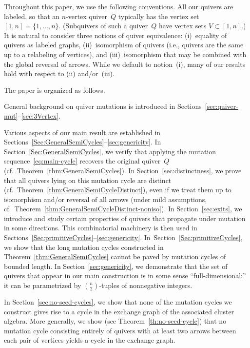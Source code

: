 \documentclass[11pt, letterpaper]{amsart}
\theoremstyle{definition}
\numberwithin{equation}{section}
\begin{document}
\medskip

Throughout this paper, we use the following conventions. 
All our quivers are labeled, so that an $n$-vertex quiver~$Q$ typically has the vertex set $[1,n]=\{1,\ldots, n\}$. 
(Subquivers of such a quiver~$Q$ have vertex sets $V\subset [1,n]$.) 
It is natural to consider three notions of quiver equivalence: 
(i)~equality of quivers as labeled graphs, 
\hbox{(ii)~isomorphism} of quivers  (i.e., quivers are the same up to a relabeling of vertices), and 
(iii)~isomorphism that may be combined with the global reversal of arrows. 
While we default to notion~(i), many of our results hold with respect to (ii) and/or~(iii). 


\medskip

The paper is organized as follows. 

General background on quiver mutations is intro\-duced in Sections~\ref{sec:quiver-mut}--\ref{sec:3Vertex}. 

Various aspects of our main result are established in 
Sections~\ref{Sec:GeneralSemiCycles}--\ref{sec:genericity}.
In Section~\ref{Sec:GeneralSemiCycles}, we verify that applying the mutation sequence~\eqref{eq:main-cycle}
recovers the original quiver~$Q$ (cf.\ Theorem~\ref{thm:GeneralSemiCycles}). 
In Section~\ref{sec:distinctness}, we prove that all  quivers lying on this mutation cycle are distinct
(cf.\ Theorem~\ref{thm:GeneralSemiCycleDistinct}),
even if we treat them up to isomorphism and/or reversal of all arrows 
(under mild assumptions, cf.\ Theorem~\ref{thm:GeneralSemiCycleDistinct-noniso}). 
In Section~\ref{sec:exits}, we introduce and study certain properties of quivers that propagate under mutation in some directions. 
This combinatorial machinery is then used in Sections~\ref{Sec:primitiveCycles}--\ref{sec:genericity}.  
In~Section~\ref{Sec:primitiveCycles}, we show that the long mutation cycles constructed in Theorem~\ref{thm:GeneralSemiCycles}
cannot be paved by mutation cycles of bounded length. 
In Section~\ref{sec:genericity}, we demonstrate that the set of quivers that appear in our main construction 
is in some sense ``full-dimensional:''
it can be parametrized by $\binom{n}{2}$-tuples of nonnegative integers. 

In Section~\ref{sec:no-seed-cycles}, we show that 
none of the mutation cycles we construct gives rise to a cycle in the exchange graph of the associated cluster algebra. 
More generally, we show (see Theorem~\ref{th:no-seed-cycle}) that
no mutation cycle consisting entirely of quivers with at least two arrows between each pair of vertices 
yields a cycle in the exchange graph.
\end{document}
